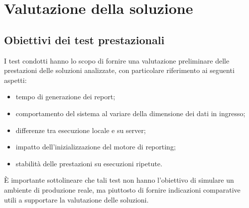 \chapter{Valutazione della soluzione}

\label{cap:valutazione}



\section{Obiettivi dei test prestazionali}
I test condotti hanno lo scopo di fornire una valutazione preliminare delle prestazioni delle soluzioni analizzate, con particolare riferimento ai seguenti aspetti:
\begin{itemize}
    \item tempo di generazione dei report;
    \item comportamento del sistema al variare della dimensione dei dati in ingresso;
    \item differenze tra esecuzione locale e su server;
    \item impatto dell'inizializzazione del motore di reporting;
    \item stabilità delle prestazioni su esecuzioni ripetute.
\end{itemize}
È importante sottolineare che tali test non hanno l'obiettivo di simulare un ambiente di produzione reale, ma piuttosto di fornire indicazioni comparative utili a supportare la valutazione delle soluzioni.

